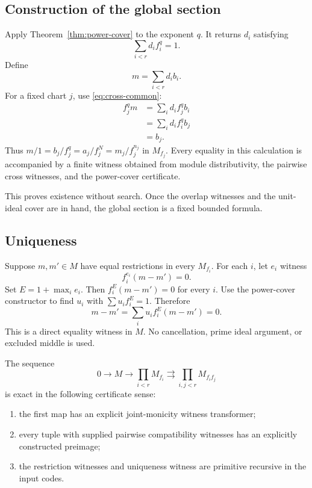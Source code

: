 \subsection{Construction of the global section}

Apply Theorem~\ref{thm:power-cover} to the exponent $q$.  It returns $d_i$ satisfying
\[
                         \sum_{i<r}d_i f_i^q=1.
\]
Define
\begin{equation}\label{eq:global-glue}
                         m=\sum_{i<r}d_i b_i.
\end{equation}
For a fixed chart $j$, use \eqref{eq:cross-common}:
\begin{align*}
 f_j^q m
   &=\sum_i d_i f_j^q b_i\\
   &=\sum_i d_i f_i^q b_j\\
   &=b_j.
\end{align*}
Thus $m/1=b_j/f_j^q=a_j/f_j^N=m_j/f_j^{n_j}$ in $M_{f_j}$.  Every equality in this calculation is
accompanied by a finite witness obtained from module distributivity, the pairwise cross witnesses,
and the power-cover certificate.

This proves existence without search.  Once the overlap witnesses and the unit-ideal cover are in
hand, the global section is a fixed bounded formula.

\subsection{Uniqueness}

Suppose $m,m'\in M$ have equal restrictions in every $M_{f_i}$.  For each $i$, let $e_i$ witness
\[
                            f_i^{e_i}(m-m')=0.
\]
Set $E=1+\max_i e_i$.  Then $f_i^E(m-m')=0$ for every $i$.  Use the power-cover constructor to find
$u_i$ with $\sum u_i f_i^E=1$.  Therefore
\[
  m-m'=\sum_i u_i f_i^E(m-m')=0.
\]
This is a direct equality witness in $M$.  No cancellation, prime ideal argument, or excluded middle
is used.

\begin{corollary}\label{cor:equalizer}
The sequence
\[
  0\longrightarrow M
   \longrightarrow \prod_{i<r}M_{f_i}
   \rightrightarrows \prod_{i,j<r}M_{f_if_j}
\]
is exact in the following certificate sense:
\begin{enumerate}[label=(\alph*)]
\item the first map has an explicit joint-monicity witness transformer;
\item every tuple with supplied pairwise compatibility witnesses has an explicitly constructed
      preimage;
\item the restriction witnesses and uniqueness witness are primitive recursive in the input codes.
\end{enumerate}
\end{corollary}

